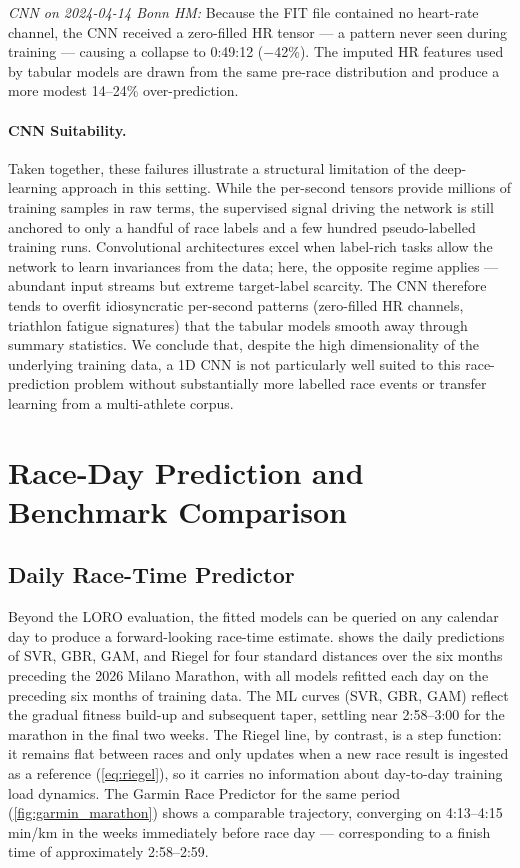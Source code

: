 \documentclass[11pt, a4paper]{article}
\begin{document}
\emph{CNN on 2024-04-14 Bonn HM:} Because the FIT file contained no
heart-rate channel, the CNN received a zero-filled HR tensor --- a pattern
never seen during training --- causing a collapse to 0:49:12 ($-$42\%).
The imputed HR features used by tabular models are drawn from the same
pre-race distribution and produce a more modest 14--24\% over-prediction.

\paragraph{CNN Suitability.}
Taken together, these failures illustrate a structural limitation of the
deep-learning approach in this setting.
While the per-second tensors provide millions of training samples in raw terms,
the supervised signal driving the network is still anchored to only a handful
of race labels and a few hundred pseudo-labelled training runs.
Convolutional architectures excel when label-rich tasks allow the network to
learn invariances from the data; here, the opposite regime applies --- abundant
input streams but extreme target-label scarcity.
The CNN therefore tends to overfit idiosyncratic per-second patterns
(zero-filled HR channels, triathlon fatigue signatures) that the tabular
models smooth away through summary statistics.
We conclude that, despite the high dimensionality of the underlying training
data, a 1D CNN is not particularly well suited to this race-prediction problem
without substantially more labelled race events or transfer learning from a
multi-athlete corpus.

\section{Race-Day Prediction and Benchmark Comparison}
\label{sec:predictor}

\subsection{Daily Race-Time Predictor}
\label{ssec:daily_predictor}

Beyond the LORO evaluation, the fitted models can be queried on any calendar
day to produce a forward-looking race-time estimate.
 shows the daily predictions of SVR, GBR, GAM, and Riegel
for four standard distances over the six months preceding the 2026 Milano
Marathon, with all models refitted each day on the preceding six months of
training data.
The ML curves (SVR, GBR, GAM) reflect the gradual fitness build-up and
subsequent taper, settling near 2:58--3:00 for the marathon in the final two
weeks.
The Riegel line, by contrast, is a step function: it remains flat between
races and only updates when a new race result is ingested as a reference
(\cref{eq:riegel}), so it carries no information about day-to-day training
load dynamics.
The Garmin Race Predictor for the same period (\cref{fig:garmin_marathon})
shows a comparable trajectory, converging on 4:13--4:15 min/km in the weeks
immediately before race day --- corresponding to a finish time of
approximately 2:58--2:59.
\end{document}
